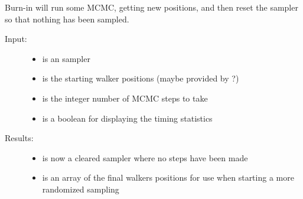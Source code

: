 \documentclass[letterpaper,10pt,english]{sphinxmanual}
\begin{document}

\begin{fulllineitems}
\label{code_mcmc:mcmc.burn_in}
Burn-in will run some MCMC, getting new positions, and then reset the sampler so that nothing has been sampled.
\begin{description}
\item[{Input:}] \leavevmode\begin{itemize}
\item {} 
 is an  sampler

\item {} 
 is the starting walker positions (maybe provided by ?)

\item {} 
 is the integer number of MCMC steps to take

\item {} 
 is a boolean for displaying the timing statistics

\end{itemize}

\item[{Results:}] \leavevmode\begin{itemize}
\item {} 
 is now a cleared  sampler where no steps have been made

\item {} 
 is an array of the final walkers positions for use when starting a more randomized sampling

\end{itemize}

\end{description}

\end{fulllineitems}

\end{document}
